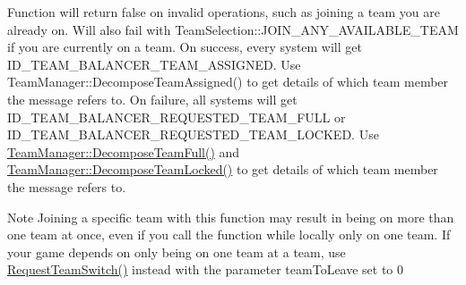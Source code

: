 Function will return false on invalid operations, such as joining a team you are already on. Will also fail with Team\-Selection\-::\-J\-O\-I\-N\-\_\-\-A\-N\-Y\-\_\-\-A\-V\-A\-I\-L\-A\-B\-L\-E\-\_\-\-T\-E\-A\-M if you are currently on a team. On success, every system will get I\-D\-\_\-\-T\-E\-A\-M\-\_\-\-B\-A\-L\-A\-N\-C\-E\-R\-\_\-\-T\-E\-A\-M\-\_\-\-A\-S\-S\-I\-G\-N\-E\-D. Use Team\-Manager\-::\-Decompose\-Team\-Assigned() to get details of which team member the message refers to. On failure, all systems will get I\-D\-\_\-\-T\-E\-A\-M\-\_\-\-B\-A\-L\-A\-N\-C\-E\-R\-\_\-\-R\-E\-Q\-U\-E\-S\-T\-E\-D\-\_\-\-T\-E\-A\-M\-\_\-\-F\-U\-L\-L or I\-D\-\_\-\-T\-E\-A\-M\-\_\-\-B\-A\-L\-A\-N\-C\-E\-R\-\_\-\-R\-E\-Q\-U\-E\-S\-T\-E\-D\-\_\-\-T\-E\-A\-M\-\_\-\-L\-O\-C\-K\-E\-D. Use \hyperlink{class_rak_net_1_1_team_manager_a47aa6ab98611642ae31e60f91ea3a4fc}{Team\-Manager\-::\-Decompose\-Team\-Full()} and \hyperlink{class_rak_net_1_1_team_manager_a850f25565938281baf0c1b3cba64560d}{Team\-Manager\-::\-Decompose\-Team\-Locked()} to get details of which team member the message refers to. \begin{DoxyNote}{Note}
Joining a specific team with this function may result in being on more than one team at once, even if you call the function while locally only on one team. If your game depends on only being on one team at a team, use \hyperlink{class_rak_net_1_1_t_m___team_member_a27aaf07915c7c5071064f3c7e7cb78bd}{Request\-Team\-Switch()} instead with the parameter team\-To\-Leave set to 0 
\end{DoxyNote}

